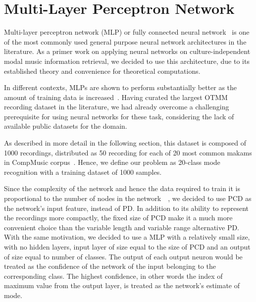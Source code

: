 \documentclass{sig-alternate}
\begin{document}
\section{Multi-Layer Perceptron Network}\label{sec:neuralnet}
Multi-layer perceptron network (MLP) or fully connected neural network~\cite{neural_textbook} is one of the most commonly used general purpose neural network architectures in the literature. As a primer work on applying neural networks on culture-independent modal music information retrieval, we decided to use this architecture, due to its established theory and convenience for theoretical computations. 

In different contexts, MLPs are shown to perform substantially better as the amount of training data is increased~\cite{ciresan}. Having curated the largest OTMM recording dataset in the literature, we had already overcome a challenging prerequisite for using neural networks for these task, considering the lack of available public datasets for the domain.

As described in more detail in the following section, this dataset is composed of 1000 recordings, distributed as 50 recording for each of 20 most common makams in CompMusic corpus~\cite{compmusic_corpus}. Hence, we define our problem as 20-class mode recognition with a training dataset of 1000 samples.

Since the complexity of the network and hence the data required to train it is proportional to the number of nodes in the network~\cite{vc-dimension}~\cite{bartlett}, we decided to use PCD as the network's input feature, instead of PD. In addition to its ability to represent the recordings more compactly, the fixed size of PCD make it a much more convenient choice than the variable length and variable range alternative PD. With the same motivation, we decided to use a MLP with a relatively small size, with no hidden layers, input layer of size equal to the size of PCD and an output of size equal to number of classes. The output of each output neuron would be treated as the confidence of the network of the input belonging to the corresponding class. The highest confidence, in other words the index of maximum value from the output layer, is treated as the network's estimate of mode.
\end{document}
